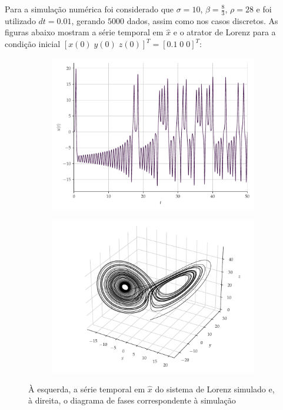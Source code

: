 \documentclass[10pt, technote]{article}
\begin{document}
Para a simulação numérica foi considerado que $\sigma = 10$, $\beta = \frac{8}{3}$, $\rho = 28$ e foi utilizado $dt = 0.01$, gerando $5000$ dados, assim como nos casos discretos. As figuras abaixo mostram a série temporal em $\hat{x}$ e o atrator de Lorenz para a condição inicial $[x(0)\; y(0)\; z(0)]^T = [0.1\; 0\; 0]^T$:
\begin{figure}[H]
     \centering
     \begin{subfigure}
         \centering
         \includegraphics[scale=0.24]{serie-lorenz-x.pdf}
     \end{subfigure}
     \begin{subfigure}
         \centering
         \includegraphics[scale=0.24]{diagrama-de-fases-lorenz.pdf}
     \end{subfigure}
     \caption{À esquerda, a série temporal em $\hat{x}$ do sistema de Lorenz simulado e, à direita, o diagrama de fases correspondente à simulação}
     \label{fig:lorenz}
\end{figure}
\end{document}
